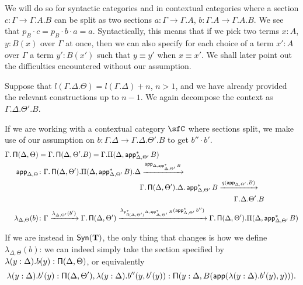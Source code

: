 We will do so for syntactic categories and in contextual categories where a
section $c\colon\Gamma\rightarrow\Gamma.A.B$ can be split as
two sections $a\colon\Gamma\rightarrow\Gamma.A$,
$b\colon\Gamma.A\rightarrow\Gamma.A.B$.
We see that $p_B\cdot c=p_B\cdot b\cdot a=a$. Syntactically, this means that if
we pick two terms $x:A$, $y:B(x)$ over $\Gamma$ at once, then we can also
specify for each choice of a term $x':A$ over $\Gamma$ a term $y':B(x')$ such
that $y\equiv y'$ when $x\equiv x'$. We shall later point out the
difficulties encountered without our assumption.

\begin{construction}[Part 2]
  Suppose that
  $l(\Gamma.\Delta.\Theta)=l(\Gamma.\Delta)+n$, $n>1$, and we have already
  provided the relevant constructions up to $n-1$. We again decompose
  the context as $\Gamma.\Delta.\Theta'.B$.

  If we are working with a contextual category $\sfC$ where sections split, we
  make use of our assumption on
  $b\colon\Gamma.\Delta\rightarrow\Gamma.\Delta.\Theta'.B$ to get $b''\cdot b'$.
  \begin{align*}
    \Gamma.\operatorname{\mathsf{\Pi}}(\Delta,\Theta)
    &=\Gamma.\operatorname{\mathsf{\Pi}}(\Delta,\Theta'.B)=\Gamma.\Pi(\Delta,\operatorname{\mathsf{app}}^*_{\Delta,\Theta'}B) \\
    \operatorname{\mathsf{app}}_{\Delta,\Theta}
    &\colon\Gamma.\operatorname{\mathsf{\Pi}}(\Delta,\Theta').\Pi(\Delta,\operatorname{\mathsf{app}}^*_{\Delta,\Theta'}B).\Delta
    \xrightarrow{\operatorname{\mathsf{app}}_{\Delta,\operatorname{\mathsf{app}}^*_{\Delta,\Theta'}B}} \\
    &\quad\quad\quad\quad\quad\quad\quad\quad\quad\quad\quad\quad\quad\quad
    \Gamma.\operatorname{\mathsf{\Pi}}(\Delta,\Theta').\Delta.\operatorname{\mathsf{app}}^*_{\Delta,\Theta'}B
    \xrightarrow{q(\operatorname{\mathsf{app}}_{\Delta,\Theta'},B)} \\
    &\quad\quad\quad\quad\quad\quad\quad\quad\quad\quad\quad\quad\quad\quad\quad\quad\quad\quad\quad\quad\quad\quad\quad\quad\quad\quad\quad
    \Gamma.\Delta.\Theta'.B \\
    \lambda_{\Delta,\Theta}(b)
    &\colon\Gamma
    \xrightarrow{\lambda_{\Delta,\Theta'}(b')}
    \Gamma.\operatorname{\mathsf{\Pi}}(\Delta,\Theta')
    \xrightarrow{\lambda_{p^*_{\operatorname{\mathsf{\Pi}}(\Delta,\Theta')}\Delta,\operatorname{\mathsf{app}}^*_{\Delta,\Theta'}B}(\operatorname{\mathsf{app}}_{\Delta,\Theta'}^*b'')}
    \Gamma.\operatorname{\mathsf{\Pi}}(\Delta,\Theta').\Pi(\Delta,\operatorname{\mathsf{app}}^*_{\Delta,\Theta'}B)
  \end{align*}

  If we are instead in $\mathsf{Syn}(\mathbf{T})$, the only thing that changes is how we define
  $\lambda_{\Delta,\Theta}(b)$: we can indeed simply take the section specified
  by $\lambda(y:\Delta).b(y):\operatorname{\mathsf{\Pi}}(\Delta,\Theta)$, or equivalently
  $$\lambda(y:\Delta).b'(y):\operatorname{\mathsf{\Pi}}(\Delta,\Theta'),\lambda(y:\Delta).b''(y,b'(y)):\operatorname{\mathsf{\Pi}}(y:\Delta,B(\operatorname{\mathsf{app}}(\lambda(y:\Delta).b'(y),y))).$$
\end{construction}

